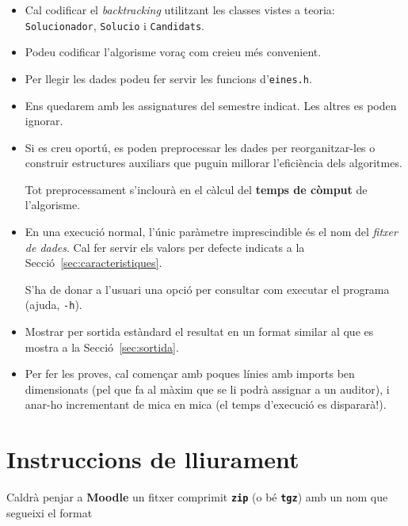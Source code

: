 \documentclass[10pt,a4paper]{../documents/class_material_assignatura_udg}
\begin{document}
\begin{itemize}
    \item Cal codificar el \textit{backtracking} utilitzant les classes vistes a teoria: \texttt{Solucionador}, \texttt{Solucio} i \texttt{Candidats}.
    
    \item Podeu codificar l'algorisme voraç com creieu més convenient.
    
    \item Per llegir les dades podeu fer servir les funcions d'\texttt{eines.h}.
    
    \item Ens quedarem amb les assignatures del semestre indicat. Les altres es poden ignorar.

    \item Si es creu oportú, es poden preprocessar les dades per reorganitzar-les o construir estructures auxiliars que puguin millorar l'eficiència dels algoritmes. 
    
    Tot preprocessament s'inclourà en el càlcul del \textbf{temps de còmput} de l'algorisme.

    \item En una execució normal, l'únic paràmetre imprescindible és el nom del \textit{fitxer de dades}. Cal fer servir els valors per defecte indicats a la Secció~\ref{sec:caracteristiques}. 
    
    S'ha de donar a l'usuari una opció per consultar com executar el programa (ajuda, \texttt{-h}).

    \item Mostrar per sortida estàndard el resultat en un format similar al que es mostra a la Secció~\ref{sec:sortida}.
    
    
    
    \item Per fer les proves, cal començar amb poques línies amb imports ben dimensionats (pel que fa al màxim que se li podrà assignar a un auditor), i anar-ho incrementant de mica en mica (el temps d'execució es dispararà!).
\end{itemize}

\clearpage

\section{Instruccions de lliurament}

Caldrà penjar a \textbf{Moodle} un fitxer comprimit \textbf{\texttt{zip}} (o bé \textbf{\texttt{tgz}}) amb un nom que segueixi el format
\end{document}

